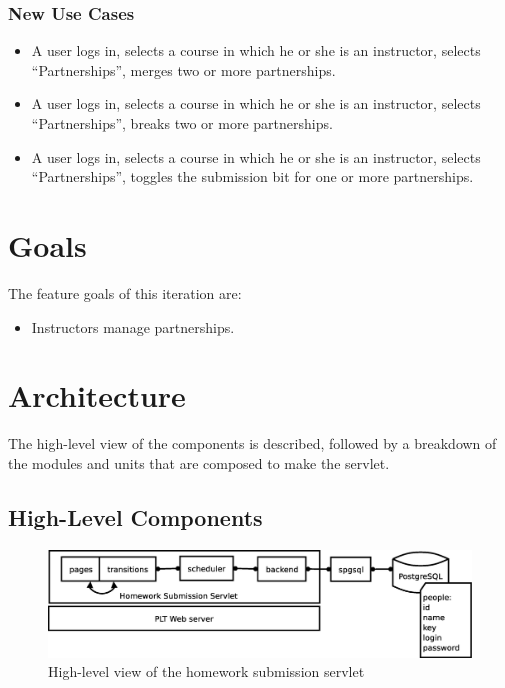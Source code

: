 \documentclass[a4paper]{article}
\begin{document}
\subsubsection{New Use Cases}\label{subsubsec:newusecases}
\begin{itemize}
  \item{A user logs in, selects a course in which he or she is an instructor,
    selects ``Partnerships'', merges two or more partnerships.}
  \item{A user logs in, selects a course in which he or she is an instructor,
    selects ``Partnerships'', breaks two or more partnerships.}
  \item{A user logs in, selects a course in which he or she is an instructor,
    selects ``Partnerships'', toggles the submission bit for one or more
    partnerships.}
\end{itemize}

\section{Goals}\label{sec:goals}

The feature goals of this iteration are:

\begin{itemize}
  \item{Instructors manage partnerships.}
\end{itemize}

\section{Architecture}\label{sec:arch}

The high-level view of the components is described, followed by a breakdown of
the modules and units that are composed to make the servlet.

\subsection{High-Level Components}\label{subsec:high-level}

\begin{figure}[ht]
\centering
\includegraphics[scale=.35]{architecture.eps}
\caption{High-level view of the homework submission servlet}
\label{fig:architecture}
\end{figure}
\end{document}
